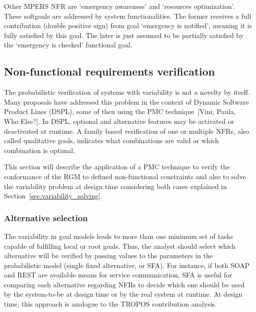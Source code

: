 
Other MPERS NFR are `emergency awareness' and `resources optimization'. These softgoals are addressed by system functionalities. The former receives a full contribution (double positive sign) from goal `emergency is notified', meaning it is fully satisfied by this goal. The later is just assumed to be partially satisfied by the `emergency is checked' functional goal.

\subsection{Non-functional requirements verification}


The probabilistic verification of systems with variability is not a novelty by itself. Many proposals have addressed this problem in the context of Dynamic Software Product Lines (DSPL), some of then using the PMC technique~[Vini, Paula, Who Else?]. In DSPL, optional and alternative features may be activated or deactivated at runtime. A family based verification of one or multiple NFRs, also called qualitative goals, indicates what combinations are valid or which combination is optimal.

This section will describe the application of a PMC technique to verify the conformance of the RGM to defined non-functional constraints and also to solve the variability problem at design time considering both cases explained in Section~\ref{sec:variability_solving}.

\subsubsection{Alternative selection}

The variability in goal models leads to more than one minimum set of tasks capable of fulfilling local or root goals. Thus, the analyst should select which alternative will be verified by passing values to the parameters in the probabilistic model (single fixed alternative, or SFA). For instance, if both SOAP and REST are available means for service communication, SFA is useful for comparing each alternative regarding NFRs to decide which one should be used by the system-to-be at design time or by the real system at runtime. At design time, this approach is analogue to the TROPOS contribution analysis. 


